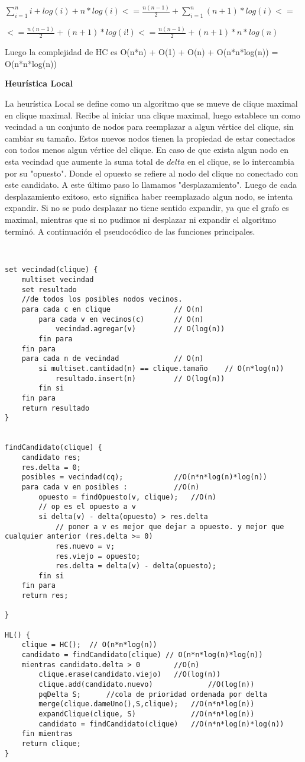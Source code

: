 $\displaystyle \sum_{i=1}^{n} i + log(i) + n*log(i) <= \frac{n(n-1)}{2}+\sum_{i=1}^{n} (n+1)*log(i) <=$  
 
$\displaystyle  <= \frac{n(n-1)}{2}+(n+1)*log(i!) <= \frac{n(n-1)}{2}+(n+1)*n*log(n) $

Luego la complejidad de HC es O(n*n) + O(1) + O(n) + O(n*n*log(n)) = O(n*n*log(n))  

\textbf{Heurística Local}

La heurística Local se define como un algoritmo que se mueve de clique maximal en clique maximal. Recibe al iniciar una clique maximal, luego establece un como vecindad a un conjunto de nodos para reemplazar a algun vértice del clique, sin cambiar su tamaño. Estos nuevos nodos tienen la propiedad de estar conectados con todos menos algun vértice del clique. En caso de que exista algun nodo en esta vecindad que aumente la suma total de $delta$ en el clique, se lo intercambia por su "opuesto". Donde el opuesto se refiere al nodo del clique no conectado con este candidato. A este último paso lo llamamos "desplazamiento". Luego de cada desplazamiento exitoso, esto significa haber reemplazado algun nodo, se intenta expandir. Si no se pudo desplazar no tiene sentido expandir, ya que el grafo es maximal, mientras que si no pudimos ni desplazar ni expandir el algoritmo terminó. A continuación el pseudocódico de las funciones principales.


\begin{verbatim}


set vecindad(clique) {
    multiset vecindad
    set resultado
    //de todos los posibles nodos vecinos.
    para cada c en clique				// O(n)
		para cada v en vecinos(c)		// O(n)
			vecindad.agregar(v)			// O(log(n))
		fin para
	fin para
	para cada n de vecindad				// O(n)
		si multiset.cantidad(n) == clique.tamaño	// O(n*log(n))
			resultado.insert(n)			// O(log(n))
		fin si
	fin para
	return resultado
}


findCandidato(clique) {
	candidato res;
    res.delta = 0;
    posibles = vecindad(cq); 			//O(n*n*log(n)*log(n))
    para cada v en posibles :			//O(n)
        opuesto = findOpuesto(v, clique);	//O(n)
        // op es el opuesto a v
        si delta(v) - delta(opuesto) > res.delta
			// poner a v es mejor que dejar a opuesto. y mejor que cualquier anterior (res.delta >= 0)
            res.nuevo = v;
            res.viejo = opuesto;
			res.delta = delta(v) - delta(opuesto);
        fin si
    fin para
    return res;

}

HL() {
	clique = HC();	// O(n*n*log(n))
	candidato = findCandidato(clique) // O(n*n*log(n)*log(n))
	mientras candidato.delta > 0		//O(n)
		clique.erase(candidato.viejo)	//O(log(n))
		clique.add(candidato.nuevo)				//O(log(n))
		pqDelta S; 		//cola de prioridad ordenada por delta
		merge(clique.dameUno(),S,clique);	//O(n*n*log(n))
		expandClique(clique, S)				//O(n*n*log(n))
		candidato = findCandidato(clique)	//O(n*n*log(n)*log(n))			
	fin mientras
    return clique;
}
\end{verbatim}

